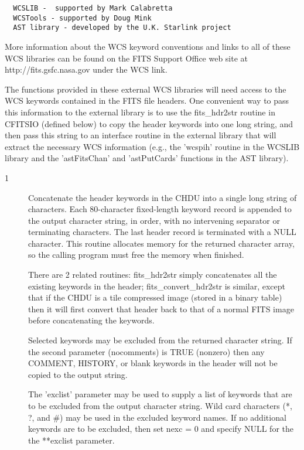 \documentclass[11pt]{book}
\begin{document}
\begin{verbatim}
  WCSLIB -  supported by Mark Calabretta
  WCSTools - supported by Doug Mink
  AST library - developed by the U.K. Starlink project
\end{verbatim}

More information about the WCS keyword conventions and links to all of
these WCS libraries can be found on the FITS Support Office web site at
http://fits.gsfc.nasa.gov under the WCS link.

The functions provided in these external WCS libraries will need
access to the  WCS keywords contained in the FITS file headers.
One convenient way to pass this information to the external library is
to use the fits\_hdr2str routine in CFITSIO (defined below) to copy the
header keywords into one long string, and then pass this string to an
interface routine in the external library that will extract
the necessary WCS information (e.g., the 'wcspih' routine in the WCSLIB
library and the 'astFitsChan' and 'astPutCards' functions in the AST
library).


\begin{description}
\item[1 ] Concatenate the header keywords in the CHDU into a single long
    string of characters. Each 80-character fixed-length keyword
    record is appended to the output character string, in order, with
    no intervening separator or terminating characters. The last header
    record is terminated with a NULL character.  This routine allocates
    memory for the returned character array, so the calling program must
    free the memory when finished.

    There are 2 related routines: fits\_hdr2str simply concatenates all
    the existing keywords in the header; fits\_convert\_hdr2str is similar,
    except that if the CHDU is a tile compressed image (stored in a binary
    table) then it will first convert that header back to that of a
    normal FITS image before concatenating the keywords.

    Selected keywords may be excluded from the returned character string.
    If the second parameter (nocomments) is TRUE (nonzero) then any
    COMMENT, HISTORY, or blank keywords in the header will not be copied
    to the output string.

    The 'exclist' parameter may be used to supply a list of keywords
    that are to be excluded from the output character string. Wild card
    characters (*, ?, and \#) may be used in the excluded keyword names.
    If no additional keywords are to be excluded, then set nexc = 0 and
   specify NULL for the the **exclist  parameter.  \label{hdr2str}
\end{description}
\end{document}
